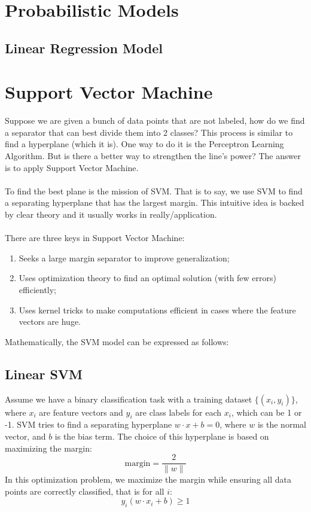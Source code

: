 \documentclass{article}
\begin{document}
\newpage
\section{Probabilistic Models}
\subsection{Linear Regression Model}


\newpage
\section{Support Vector Machine}
Suppose we are given a bunch of data points that are not labeled, how do we find a separator that can best divide them into 2 classes? This process is similar to find a hyperplane (which it is). One way to do it is the Perceptron Learning Algorithm. But is there a better way to strengthen the line's power? The answer is to apply Support Vector Machine.\\
 \\
To find the best plane is the mission of SVM. That is to say, we use SVM to find a separating hyperplane that has the largest margin. This intuitive idea is backed by clear theory and it usually works in really/application.\\
 \\
 There are three keys in Support Vector Machine:
 \begin{enumerate}
     \item Seeks a large margin separator to improve generalization;
     \item Uses optimization theory to find an optimal solution (with few errors) efficiently;
     \item Uses kernel tricks to make computations efficient in cases where the feature vectors are huge.
 \end{enumerate}
Mathematically, the SVM model can be expressed as follows:

\subsection{Linear SVM}
Assume we have a binary classification task with a training dataset \( \{(x_i, y_i)\} \), where \( x_i \) are feature vectors and \( y_i \) are class labels for each \( x_i \), which can be 1 or -1. SVM tries to find a separating hyperplane \( w \cdot x + b = 0 \), where \( w \) is the normal vector, and \( b \) is the bias term. The choice of this hyperplane is based on maximizing the margin:
\[ \text{margin} = \frac{2}{\|w\|} \]
In this optimization problem, we maximize the margin while ensuring all data points are correctly classified, that is for all \( i \):
\[ y_i (w \cdot x_i + b) \geq 1 \]
\end{document}
